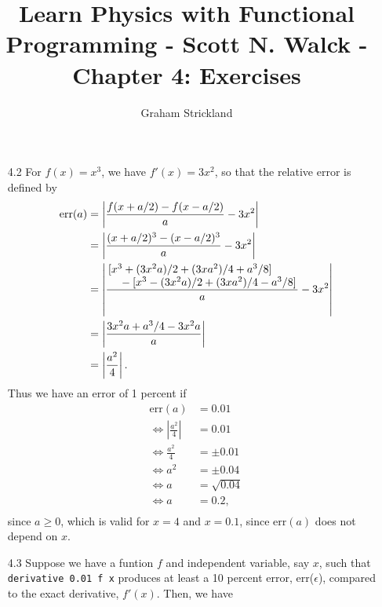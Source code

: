 \documentclass{article}
\title{Learn Physics with Functional Programming - Scott N. Walck - Chapter 4: Exercises}
\author{Graham Strickland}
\begin{document}
\maketitle  

\begin{itemize}
    \item[4.2]
    For $f(x) = x^3$, we have $f'(x) = 3x^2$, so that the relative error is defined by
    \begin{equation*}
        \begin{split}
            \text{err}(a) &= \left| \frac{f(x + a/2) - f(x - a/2)}{a} - 3x^2 \right| \\
            &= \left| \frac{(x + a/2)^3 - (x - a/2)^3}{a} - 3x^2 \right| \\
            &= \left| \frac{\splitfrac{[x^3 + (3x^2a)/2 + (3xa^2)/4 + a^3/8]}
                {{} - [x^3 - (3x^2a)/2 + (3xa^2)/4 - a^3/8]}}{a} - 3x^2 \right| \\
            &= \left| \frac{3x^2a + a^3/4 - 3x^2a}{a} \right| \\
            &= \left| \frac{a^2}{4} \right|.
        \end{split}
    \end{equation*}
    \qquad Thus we have an error of 1 percent if 
    \begin{equation*}
        \begin{split}
            \text{err}(a) &= 0.01 \\
            \Leftrightarrow \left|\frac{a^2}{4}\right| &= 0.01 \\
            \Leftrightarrow \frac{a^2}{4} &= \pm 0.01 \\
            \Leftrightarrow a^2 &= \pm 0.04 \\
            \Leftrightarrow a &= \sqrt{0.04} \\
            \Leftrightarrow a &= 0.2, \\
        \end{split}
    \end{equation*}
    since $a \geq 0$, which is valid for $x = 4$ and $x = 0.1$, since $\text{err}(a)$ does not 
    depend on $x$.
    \item[4.3]  %
    Suppose we have a funtion $f$ and independent variable, say $x$, such that 
    \verb|derivative 0.01 f x| produces at least a 10 percent error, err($\epsilon$), compared to 
    the exact derivative, $f'(x)$. Then, we have
    \begin{equation*}
        \begin{split}

\end{split}
\end{equation*}
\end{itemize}
\end{document}
